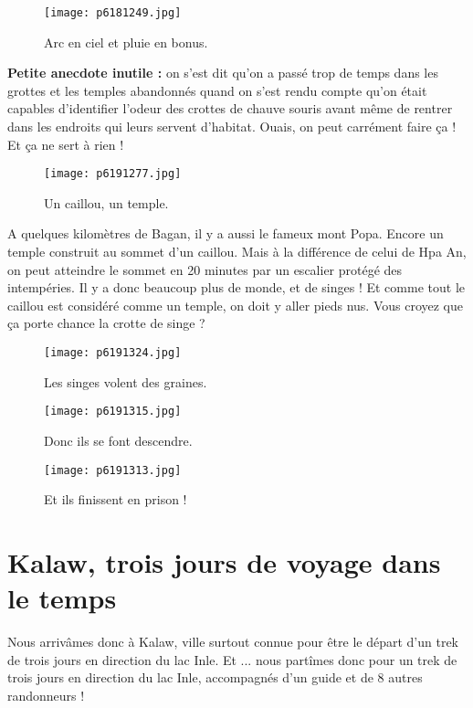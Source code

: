 \documentclass{book}
\begin{document}
\begin{figure}[h]
\centering
\texttt{[image: p6181249.jpg]}
\caption*{Arc en ciel et pluie en bonus.}
\end{figure}

\textbf{Petite anecdote inutile :} on s'est dit qu'on a passé trop de temps dans les grottes et les temples abandonnés quand on s'est rendu compte qu'on était capables d'identifier l'odeur des crottes de chauve souris avant même de rentrer dans les endroits qui leurs servent d'habitat. Ouais, on peut carrément faire ça ! Et ça ne sert à rien !


\begin{figure}[h]
\centering
\texttt{[image: p6191277.jpg]}
\caption*{Un caillou, un temple.}
\end{figure}

A quelques kilomètres de Bagan, il y a aussi le fameux mont Popa. Encore un temple construit au sommet d'un caillou. Mais à la différence de celui de Hpa An, on peut atteindre le sommet en 20 minutes par un escalier protégé des intempéries. Il y a donc beaucoup plus de monde, et de singes ! Et comme tout le caillou est considéré comme un temple, on doit y aller pieds nus. Vous croyez que ça porte chance la crotte de singe ?


\begin{figure}[h]
\centering
\texttt{[image: p6191324.jpg]}
\caption*{Les singes volent des graines.}
\end{figure}


\begin{figure}[h]
\centering
\texttt{[image: p6191315.jpg]}
\caption*{Donc ils se font descendre.}
\end{figure}


\begin{figure}[h]
\centering
\texttt{[image: p6191313.jpg]}
\caption*{Et ils finissent en prison !}
\end{figure}



\chapter{Kalaw, trois jours de voyage dans le temps}
Nous arrivâmes donc à Kalaw, ville surtout connue pour être le départ d'un trek de trois jours en direction du lac Inle. Et ... nous partîmes donc pour un trek de trois jours en direction du lac Inle, accompagnés d'un guide et de 8 autres randonneurs !
\end{document}
